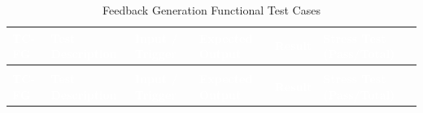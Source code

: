 \begin{longtable}{>{\bfseries}p{1.2cm} p{3.0cm} p{3.5cm} p{4.5cm} p{1.0cm} p{1.5cm}}
\caption{Feedback Generation Functional Test Cases}
\label{tab:tc-fg} \\
 
\rowcolor{headerblue}
\textcolor{white}{\textbf{TC-FG}} &
\textcolor{white}{\textbf{Test Description}} &
\textcolor{white}{\textbf{Input / Trigger}} &
\textcolor{white}{\textbf{Expected Output}} &
\textcolor{white}{\textbf{Result}} &
\textcolor{white}{\textbf{Stress Test (Pass/Total)}} \\
\endfirsthead
 
\multicolumn{6}{c}{\tablename\ \thetable{} -- continued} \\
\rowcolor{headerblue}
\textcolor{white}{\textbf{TC-FG}} &
\textcolor{white}{\textbf{Test Description}} &
\textcolor{white}{\textbf{Input / Trigger}} &
\textcolor{white}{\textbf{Expected Output}} &
\textcolor{white}{\textbf{Result}} &
\textcolor{white}{\textbf{Stress Test (Pass/Total)}} \\
\endhead
 

\end{longtable}
